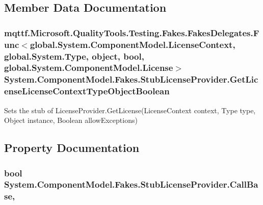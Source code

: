 \subsection{Member Data Documentation}
\hypertarget{class_system_1_1_component_model_1_1_fakes_1_1_stub_license_provider_a3e6c7eb364faa6a72716d1821b112bac}{
\subsubsection[{Get\-License\-License\-Context\-Type\-Object\-Boolean}]{\setlength{\rightskip}{0pt plus 5cm}mqttf.\-Microsoft.\-Quality\-Tools.\-Testing.\-Fakes.\-Fakes\-Delegates.\-Func$<$global.\-System.\-Component\-Model.\-License\-Context, global.\-System.\-Type, object, bool, global.\-System.\-Component\-Model.\-License$>$ System.\-Component\-Model.\-Fakes.\-Stub\-License\-Provider.\-Get\-License\-License\-Context\-Type\-Object\-Boolean}}\label{class_system_1_1_component_model_1_1_fakes_1_1_stub_license_provider_a3e6c7eb364faa6a72716d1821b112bac}


Sets the stub of License\-Provider.\-Get\-License(\-License\-Context context, Type type, Object instance, Boolean allow\-Exceptions)



\subsection{Property Documentation}
\hypertarget{class_system_1_1_component_model_1_1_fakes_1_1_stub_license_provider_a3adea9ae5c520360052d1ca08a07e190}{
\subsubsection[{Call\-Base}]{\setlength{\rightskip}{0pt plus 5cm}bool System.\-Component\-Model.\-Fakes.\-Stub\-License\-Provider.\-Call\-Base\hspace{0.3cm}{\ttfamily [get]}, {\ttfamily [set]}}}\label{class_system_1_1_component_model_1_1_fakes_1_1_stub_license_provider_a3adea9ae5c520360052d1ca08a07e190}



